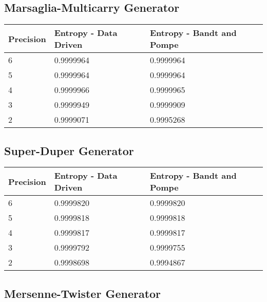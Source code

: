\documentclass[12pt,letterpaper]{article}
\begin{document}
\subsection{Marsaglia-Multicarry Generator}

\begin{table}[H]
\begin{center}
\begin{tabularx}{\textwidth}{|p{2.3cm}|p{6.0cm}|p{6.0cm}|}
\hline                              
\textbf{Precision} & \textbf{Entropy - Data Driven} & \textbf{Entropy - Bandt and Pompe}\\
\hline
6 & 0.9999964  & 0.9999964\\
\hline
5 & 0.9999964 & 0.9999964\\
\hline     
4 & 0.9999966 & 0.9999965\\
\hline     
3 & 0.9999949 & 0.9999909\\
\hline     
2 & 0.9999071 & 0.9995268\\
\hline  
\end{tabularx}
\end{center}
\end{table}

\subsection{Super-Duper Generator}

\begin{table}[H]
\begin{center}
\begin{tabularx}{\textwidth}{|p{2.3cm}|p{6.0cm}|p{6.0cm}|}
\hline                              
\textbf{Precision} & \textbf{Entropy - Data Driven} & \textbf{Entropy - Bandt and Pompe}\\
\hline
6 & 0.9999820 & 0.9999820\\
\hline
5 & 0.9999818 & 0.9999818\\
\hline     
4 & 0.9999817 & 0.9999817\\
\hline     
3 & 0.9999792 & 0.9999755\\
\hline     
2 & 0.9998698 & 0.9994867\\
\hline  
\end{tabularx}
\end{center}
\end{table}

\subsection{Mersenne-Twister Generator}
\end{document}
